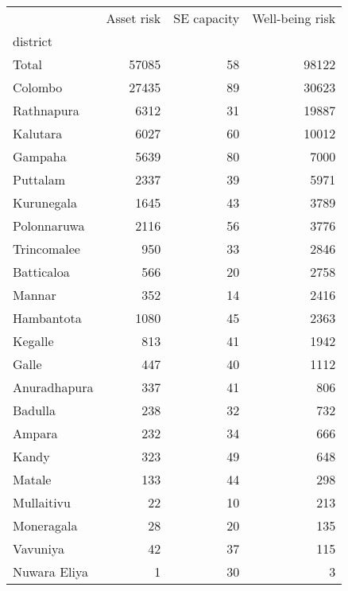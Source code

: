 \begin{tabular}{lrrr}
\toprule
{} &  Asset risk &  SE capacity &  Well-being risk \\
district     &             &              &                  \\
\midrule
Total        &       57085 &           58 &            98122 \\
Colombo      &       27435 &           89 &            30623 \\
Rathnapura   &        6312 &           31 &            19887 \\
Kalutara     &        6027 &           60 &            10012 \\
Gampaha      &        5639 &           80 &             7000 \\
Puttalam     &        2337 &           39 &             5971 \\
Kurunegala   &        1645 &           43 &             3789 \\
Polonnaruwa  &        2116 &           56 &             3776 \\
Trincomalee  &         950 &           33 &             2846 \\
Batticaloa   &         566 &           20 &             2758 \\
Mannar       &         352 &           14 &             2416 \\
Hambantota   &        1080 &           45 &             2363 \\
Kegalle      &         813 &           41 &             1942 \\
Galle        &         447 &           40 &             1112 \\
Anuradhapura &         337 &           41 &              806 \\
Badulla      &         238 &           32 &              732 \\
Ampara       &         232 &           34 &              666 \\
Kandy        &         323 &           49 &              648 \\
Matale       &         133 &           44 &              298 \\
Mullaitivu   &          22 &           10 &              213 \\
Moneragala   &          28 &           20 &              135 \\
Vavuniya     &          42 &           37 &              115 \\
Nuwara Eliya &           1 &           30 &                3 \\
\bottomrule
\end{tabular}
